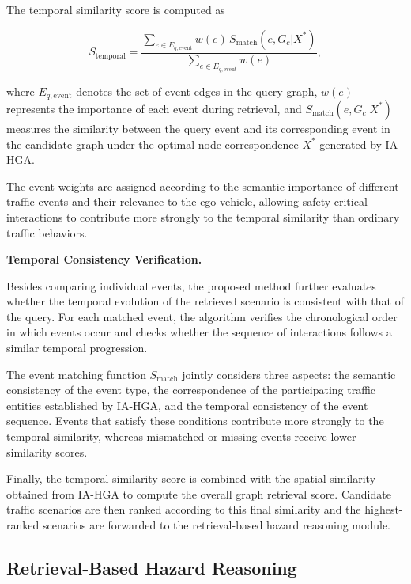 \documentclass[a4paper, 11pt]{article} %
\begin{document}
The temporal similarity score is computed as

\begin{equation}
S_{\text{temporal}}
=
\frac{
\sum\limits_{e \in E_{q,\text{event}}}
w(e)\,
S_{\text{match}}(e,G_c|X^*)
}
{
\sum\limits_{e \in E_{q,\text{event}}}
w(e)
},
\label{eq:temporal_score}
\end{equation}

where $E_{q,\text{event}}$ denotes the set of event edges in the query graph, $w(e)$ represents the importance of each event during retrieval, and $S_{\text{match}}(e,G_c|X^*)$ measures the similarity between the query event and its corresponding event in the candidate graph under the optimal node correspondence $X^*$ generated by IA-HGA.

The event weights are assigned according to the semantic importance of different traffic events and their relevance to the ego vehicle, allowing safety-critical interactions to contribute more strongly to the temporal similarity than ordinary traffic behaviors.

\textbf{Temporal Consistency Verification.}

Besides comparing individual events, the proposed method further evaluates whether the temporal evolution of the retrieved scenario is consistent with that of the query. For each matched event, the algorithm verifies the chronological order in which events occur and checks whether the sequence of interactions follows a similar temporal progression.

The event matching function $S_{\text{match}}$ jointly considers three aspects: the semantic consistency of the event type, the correspondence of the participating traffic entities established by IA-HGA, and the temporal consistency of the event sequence. Events that satisfy these conditions contribute more strongly to the temporal similarity, whereas mismatched or missing events receive lower similarity scores.

Finally, the temporal similarity score is combined with the spatial similarity obtained from IA-HGA to compute the overall graph retrieval score. Candidate traffic scenarios are then ranked according to this final similarity and the highest-ranked scenarios are forwarded to the retrieval-based hazard reasoning module.
\subsection{Retrieval-Based Hazard Reasoning}
\end{document}
